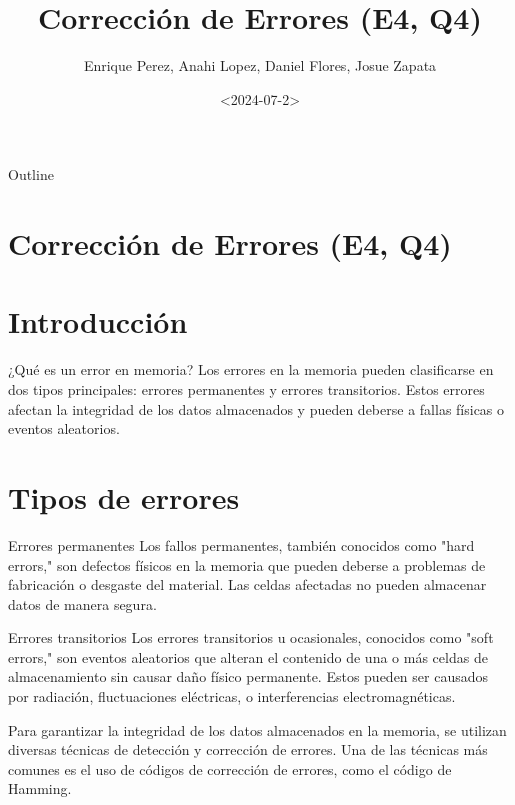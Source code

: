\documentclass[presentation]{beamer}
\author{Enrique Perez, Anahi Lopez, Daniel Flores, Josue Zapata}
\date{<2024-07-2>}
\title{Corrección de Errores (E4, Q4)}
\begin{document}
\maketitle
\begin{frame}{Outline}
\tableofcontents
\end{frame}


\section{Corrección de Errores (E4, Q4)}
\label{sec:orgc883342}
\section{Introducción}
\label{sec:org9006cee}
\begin{frame}[label={sec:org685cafc}]{¿Qué es un error en memoria?}
Los errores en la memoria pueden clasificarse en dos tipos principales: errores permanentes y errores transitorios. Estos errores afectan la integridad de los datos almacenados y pueden deberse a fallas físicas o eventos aleatorios.
\end{frame}

\section{Tipos de errores}
\label{sec:org00cb5aa}
\begin{frame}[label={sec:org880c151}]{Errores permanentes}
Los fallos permanentes, también conocidos como "hard errors," son defectos físicos en la memoria que pueden deberse a problemas de fabricación o desgaste del material. Las celdas afectadas no pueden almacenar datos de manera segura.
\end{frame}

\begin{frame}[label={sec:org878cc47}]{Errores transitorios}
Los errores transitorios u ocasionales, conocidos como "soft errors," son eventos aleatorios que alteran el contenido de una o más celdas de almacenamiento sin causar daño físico permanente. Estos pueden ser causados por radiación, fluctuaciones eléctricas, o interferencias electromagnéticas.

Para garantizar la integridad de los datos almacenados en la memoria, se utilizan diversas técnicas de detección y corrección de errores. Una de las técnicas más comunes es el uso de códigos de corrección de errores, como el código de Hamming.
\end{frame}
\end{document}
